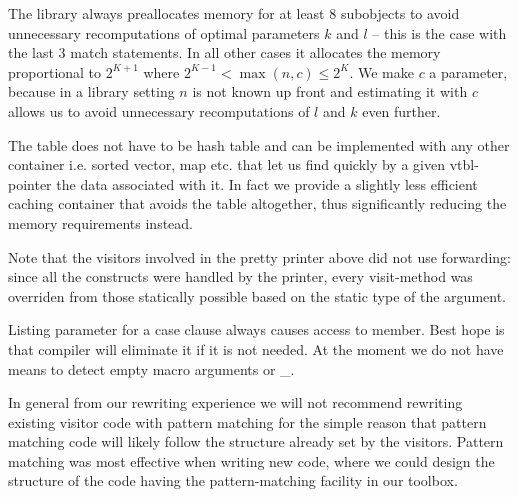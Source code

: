 The library always preallocates memory for at least 8 subobjects to avoid 
unnecessary recomputations of optimal parameters $k$ and $l$ -- this is the case 
with the last 3 match statements. In all other cases it allocates the 
memory proportional to $2^{K+1}$ where $2^{K-1} < \max(n,c) \le 2^{K}$. We make 
$c$ a parameter, because in a library setting $n$ is not known up front and 
estimating it with $c$ allows us to avoid unnecessary recomputations of $l$ and 
$k$ even further. 

The table does not have to be hash table and can be implemented with 
any other container i.e. sorted vector, map etc. that let us find quickly by a given 
vtbl-pointer the data associated with it. In fact we provide a slightly less 
efficient caching container that avoids the table altogether, thus significantly 
reducing the memory requirements instead.


%
Note that the visitors involved in the pretty printer above did not use 
forwarding: since all the \Cpp{} constructs were handled by the printer, every 
visit-method was overriden from those statically possible based on the static 
type of the argument.

Listing parameter for a case clause always causes access to member. Best hope is 
that compiler will eliminate it if it is not needed. At the moment we do not 
have means to detect empty macro arguments or \_.

In general from our rewriting experience we will not recommend rewriting 
existing visitor code with pattern matching for the simple reason that pattern 
matching code will likely follow the structure already set by the visitors. 
Pattern matching was most effective when writing new code, where we could design 
the structure of the code having the pattern-matching facility in our toolbox.


